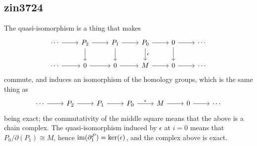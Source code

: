 \subsection{zin3724}
The quasi-isomorphism is a thing that makes
\[
\begin{tikzcd}
    \cdots \arrow[r] & P_2 \arrow[d] \arrow[r] & P_1 \arrow[d] \arrow[r] & P_0 \arrow[d,"\epsilon"] \arrow[r] & 0 \arrow[r] \arrow[d] & \cdots \\
    \cdots \arrow[r] & 0 \arrow[r]             & 0 \arrow[r]             & M \arrow[r]             & 0 \arrow[r]           & \cdots
    \end{tikzcd}
\]
commute, and induces an isomorphism of the homology groups, which is the same thing as
\[
\begin{tikzcd}
    \cdots \arrow[r] & P_2 \arrow[r] & P_1 \arrow[r] & P_0 \arrow[r,"\epsilon"] & M \arrow[r] & 0 \arrow[r] & \cdots
    \end{tikzcd}
\]
being exact; the commutativity of the middle square means that the above is a chain complex. The quasi-isomorphism induced by $\epsilon$ at $i=0$ means that $P_0/\partial(P_1)\cong M$, hence $\operatorname{\operatorname{im}}(\partial_1^P)=\ker(\epsilon)$, and the complex above is exact.